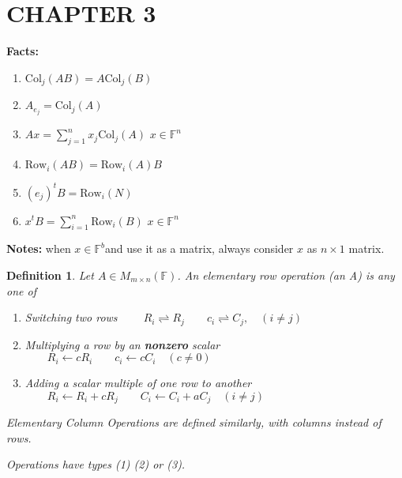 \documentclass[12pt]{article}
\newtheorem{definition}{Definition}[subsection]
\newcommand{\Col}{\mathrm{Col}}
\newcommand{\Row}{\mathrm{Row}}
\newcommand{\mF}{{\mathbb{F}}}
\begin{document}
\newpage
\section{CHAPTER 3}

	\textbf{Facts: } 
	\begin{enumerate}
		\item $\Col_j(AB) = A \Col_j(B)$
		\item $A_{e_j} = \Col_j(A)$
		\item $Ax = \sum_{j=1}^n x_j\Col_j(A)$ $x \in \mF^n$
		\item $\Row_i(AB) = \Row_i(A)B$
		\item $(e_j)^t B = \Row_i(N)$
		\item $x^t B = \sum_{i=1}^n \Row_i(B)$ $x \in \mF^n$
	\end{enumerate}
	\textbf{Notes: }when $x \in \mF^b $and use it as a matrix, always consider
	$x$ as $n \times 1$ matrix.\\

	\begin{definition}
		Let $A \in M_{m\times n}(\mF)$. An elementary row operation
		(an A) is any one of 
		\begin{enumerate}
			\item Switching two rows   
				$\qquad R_i \rightleftharpoons R_j 
				\qquad c_i \rightleftharpoons C_j, \quad (i\neq j)$
			\item Multiplying a row by an \textbf{nonzero} scalar
				$\qquad R_i \leftarrow c R_i \qquad c_i \leftarrow cC_i 
				\quad (c\neq 0)$
			\item Adding a scalar multiple of one row to another
				$\qquad R_i \leftarrow R_i + cR_j
				\qquad C_i \leftarrow C_i + aC_j \quad (i\neq j)$
		\end{enumerate}
		Elementary Column Operations are defined similarly, with columns
		instead of rows. 

		Operations have types (1) (2) or (3). \\
	\end{definition}
	
\end{document}
